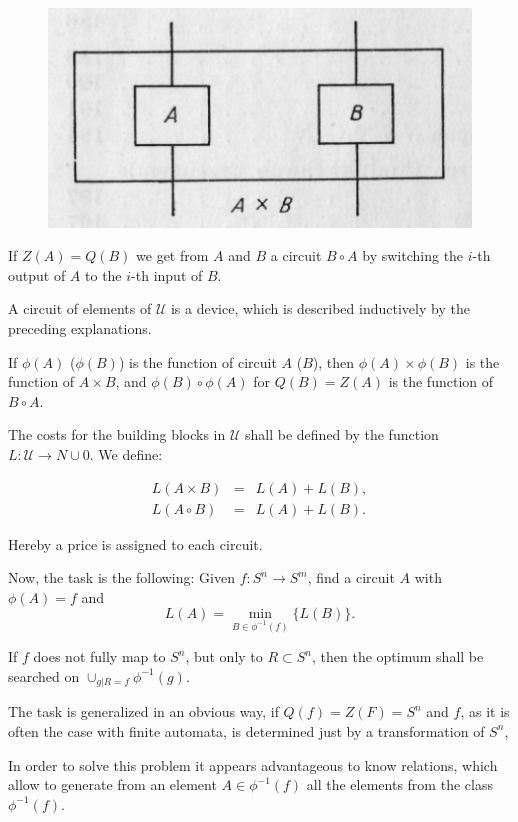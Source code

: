 \documentclass{article}
\begin{document}
\begin{figure}
\includegraphics[]{figure1.png}
\label{fig:figure1}
\caption{}
\end{figure}

If $Z(A) = Q(B)$ we get from $A$ and $B$ a circuit $B\circ A$ by switching the $i$-th output of $A$ to the $i$-th input of $B$.

A circuit of elements of $\mathcal{U}$ is a device, which is described inductively by the preceding explanations.

If $\phi(A)$ ($\phi(B)$) is the function of circuit $A$ ($B$), then $\phi(A)\times \phi(B)$ is the function of $A\times B$, and $\phi(B)\circ \phi(A)$ for $Q(B) = Z(A)$  is the function of $B\circ A$.

The costs for the building blocks in $\mathcal{U}$ shall be defined by the function $L : \mathcal{U} \rightarrow N \cup {0}$. We define:

\[
\begin{array}{lcr}
L(A\times B) & = & L(A) + L(B), \\
L(A\circ B) & = & L(A) + L(B).
\end{array}
\]

Hereby a price is assigned to each circuit.

Now, the task is the following: Given $f : S^n \rightarrow S^m$, find a circuit $A$ with $\phi(A) = f$ and
\[
L(A) = \min_{B \in \phi^{-1}(f)} \{ L(B) \}.
\]

If $f$ does not fully map to $S^n$, but only to $R \subset S^n$, then the optimum shall be searched on $\cup_{g|R=f} \phi^{-1}(g)$. 

The task is generalized in an obvious way, if $Q(f) = Z(F) = S^n$ and $f$, as it is often the case with finite automata, is determined just by a transformation of $S^n$, 

In order to solve this problem it appears advantageous to know relations, which allow to generate from an element $A \in \phi^{-1}(f)$ all the elements from the class $\phi^{-1}(f)$.
\end{document}
